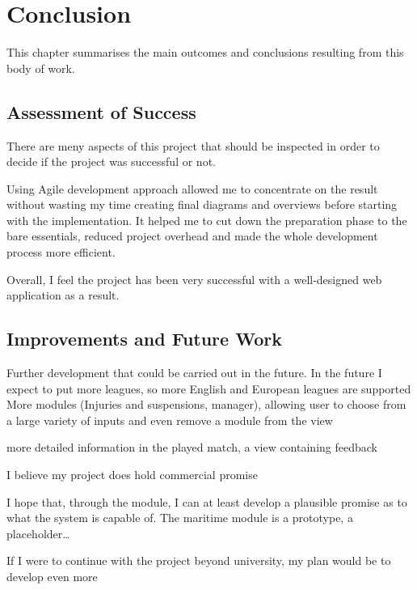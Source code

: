 \chapter{Conclusion}\label{ch:Conclusion}

This chapter summarises the main outcomes and conclusions resulting from this body of work.

\section{Assessment of Success}

There are meny aspects of this project that should be inspected in order to decide if the project was successful or not.

Using Agile development approach allowed me to concentrate on the result without wasting my time creating final diagrams and overviews before starting with the implementation. It helped me to cut down the preparation phase to the bare essentials, reduced project overhead and made the whole development process more efficient.

Overall, I feel the project has been very successful with a well-designed web application as a result.

\section{Improvements and Future Work}

Further development that could be carried out in the future.
In the future I expect to put more leagues, so more English and European leagues are supported
More modules (Injuries and suspensions, manager), allowing user to choose from a large variety of inputs and even
remove a module from the view

more detailed information in the played match, a view containing feedback

 I believe my project does hold commercial promise
 
 I hope that, through the module, I can at least develop a plausible promise as to what the system is capable of. The maritime module is a prototype, a placeholder… 
 
 If I were to continue with the project beyond university, my plan would be to develop even more
